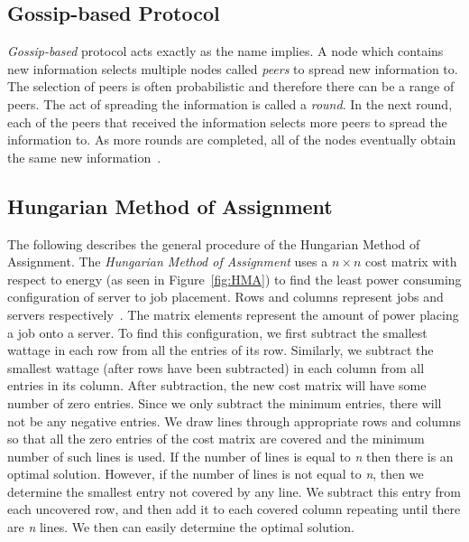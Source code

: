 \documentclass{sig-alternate}
\begin{document}
\subsection{Gossip-based Protocol}
\label{sec:GBP}

\emph{Gossip-based} protocol acts exactly as the name implies. A node which contains new information selects multiple nodes called \emph{peers} to spread new information to. The selection of peers is often probabilistic and therefore there can be a range of peers. The act of spreading the information is called a \emph{round}. In the next round, each of the peers that received the information selects more peers to spread the information to. As more rounds are completed, all of the nodes eventually obtain the same new information~\cite{Yanggratoke}.

\subsection{Hungarian Method of Assignment}
\label{sec:HMA}

The following describes the general procedure of the Hungarian Method of Assignment. The \emph{Hungarian Method of Assignment} uses a $n \times n$ cost matrix with respect to energy (as seen in Figure~\ref{fig:HMA}) to find the least power consuming configuration of server to job placement. Rows and columns represent jobs and servers respectively~\cite{Han}. The matrix elements represent the amount of power placing a job onto a server. To find this configuration, we first subtract the smallest wattage in each row from all the entries of its row. Similarly, we subtract the smallest wattage (after rows have been subtracted) in each column from all entries in its column. After subtraction, the new cost matrix will have some number of zero entries. Since we only subtract the minimum entries, there will not be any negative entries. We draw lines through appropriate rows and columns so that all the zero entries of the cost matrix are covered and the minimum number of such lines is used.  If the number of lines is equal to \emph{n} then there is an optimal solution. However, if the number of lines is not equal to \emph{n}, then we determine the smallest entry not covered by any line. We subtract this entry from each uncovered row, and then add it to each covered column repeating until there are \emph{n} lines.  We then can easily determine the optimal solution. 
\end{document}
